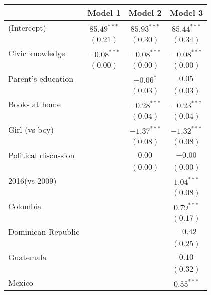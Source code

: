 \documentclass{article}
\begin{document}
\begin{table}[h!]
\begin{center}
\begin{tabular}{l c c c }
\hline
 & Model 1 & Model 2 & Model 3 \\
\hline
(Intercept)          & $85.49^{***}$ & $85.93^{***}$ & $85.44^{***}$ \\
                     & $(0.21)$      & $(0.30)$      & $(0.34)$      \\
Civic knowledge     & $-0.08^{***}$ & $-0.08^{***}$ & $-0.08^{***}$ \\
                     & $(0.00)$      & $(0.00)$      & $(0.00)$      \\
Parent's education  &               & $-0.06^{*}$   & $0.05$        \\
                     &               & $(0.03)$      & $(0.03)$      \\
Books at home        &               & $-0.28^{***}$ & $-0.23^{***}$ \\
                     &               & $(0.04)$      & $(0.04)$      \\
Girl (vs boy)        &               & $-1.37^{***}$ & $-1.32^{***}$ \\
                     &               & $(0.08)$      & $(0.08)$      \\
Political discussion &               & $0.00$        & $-0.00$       \\
                     &               & $(0.00)$      & $(0.00)$      \\
2016(vs 2009)        &               &               & $1.04^{***}$  \\
                     &               &               & $(0.08)$      \\
Colombia             &               &               & $0.79^{***}$  \\
                     &               &               & $(0.17)$      \\
Dominican Republic   &               &               & $-0.42$       \\
                     &               &               & $(0.25)$      \\
Guatemala            &               &               & $0.10$        \\
                     &               &               & $(0.32)$      \\
Mexico               &               &               & $0.55^{***}$  \\

\end{tabular}
\end{center}
\end{table}
\end{document}
